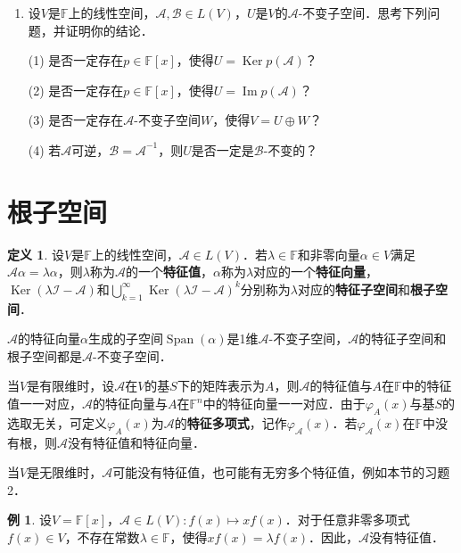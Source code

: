 \documentclass[a4paper,fontset=windows]{ctexbook}
\theoremstyle{definition}
\newtheorem{definition}{定义}[chapter]
\newtheorem{example}{例}[chapter]
\DeclareMathOperator{\im}{Im}
\DeclareMathOperator{\Ker}{Ker}
\DeclareMathOperator{\Span}{Span}
\begin{document}
\begin{enumerate}
\item 设$V$是$\mathbb{F}$上的线性空间，$\mathcal{A},\mathcal{B}\in L(V)$，$U$是$V$的$\mathcal{A}$-不变子空间．思考下列问题，并证明你的结论．

(1) 是否一定存在$p\in\mathbb{F}[x]$，使得$U=\Ker p(\mathcal{A})$？

(2) 是否一定存在$p\in\mathbb{F}[x]$，使得$U=\im p(\mathcal{A})$？

(3) 是否一定存在$\mathcal{A}$-不变子空间$W$，使得$V=U\oplus W$？

(4) 若$\mathcal{A}$可逆，$\mathcal{B=A}^{-1}$，则$U$是否一定是$\mathcal{B}$-不变的？

\end{enumerate}

\clearpage\section{根子空间}

\begin{definition}
设$V$是$\mathbb{F}$上的线性空间，$\mathcal{A}\in L(V)$．若$\lambda\in\mathbb{F}$和非零向量$\alpha\in V$满足$\mathcal{A}\alpha=\lambda\alpha$，则$\lambda$称为$\mathcal{A}$的一个{\bf 特征值}，$\alpha$称为$\lambda$对应的一个{\bf 特征向量}，$\Ker(\lambda\mathcal{I-A})$和$\bigcup\limits_{k=1}^\infty\Ker(\lambda\mathcal{I-A})^k$分别称为$\lambda$对应的{\bf 特征子空间}和{\bf 根子空间}．
\end{definition}

$\mathcal{A}$的特征向量$\alpha$生成的子空间$\Span(\alpha)$是1维$\mathcal{A}$-不变子空间，$\mathcal{A}$的特征子空间和根子空间都是$\mathcal{A}$-不变子空间．

当$V$是有限维时，设$\mathcal{A}$在$V$的基$S$下的矩阵表示为$A$，则$\mathcal{A}$的特征值与$A$在$\mathbb{F}$中的特征值一一对应，$\mathcal{A}$的特征向量与$A$在$\mathbb{F}^n$中的特征向量一一对应．由于$\varphi_A(x)$与基$S$的选取无关，可定义$\varphi_A(x)$为$\mathcal{A}$的{\bf 特征多项式}，记作$\varphi_{\mathcal{A}}(x)$．若$\varphi_{\mathcal{A}}(x)$在$\mathbb{F}$中没有根，则$\mathcal{A}$没有特征值和特征向量．

当$V$是无限维时，$\mathcal{A}$可能没有特征值，也可能有无穷多个特征值，例如本节的习题2．

\begin{example}
设$V=\mathbb{F}[x]$，$\mathcal{A}\in L(V):f(x)\mapsto xf(x)$．对于任意非零多项式$f(x)\in V$，不存在常数$\lambda\in\mathbb{F}$，使得$xf(x)=\lambda f(x)$．因此，$\mathcal{A}$没有特征值．
\end{example}
\end{document}
